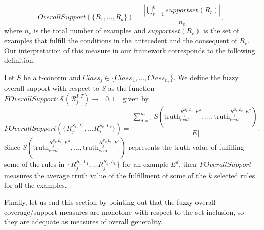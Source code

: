\begin{itemize}
	$$OverallSupport(\{R_1,\dots,R_k\}) = \frac{ \left|\displaystyle \bigcup_{r=1}^k supportset(R_r)\right|}{n_e},$$
	where $n_e$ is the total number of examples and $supportset(R_r)$ is the set of examples that fulfill the conditions in the antecedent and the consequent of $R_r$. Our interpretation of this measure in our framework corresponds to the following definition.
	\begin{definition}\label{def:FOverallSupport}
		Let $S$ be a t-conorm and $Class_j \in \{Class_1,\dots,Class_{n_c}\}$. We define the fuzzy overall support with respect to $S$ as the function $FOverallSupport : \mathcal{S}(\mathcal{R}^{I,T}_j) \to [0,1]$ given by 
		$$FOverallSupport(\{R^{S_1,L_1}_{j},\dots R^{S_k,L_k}_{j}\}) = \frac{ \displaystyle \sum_{d=1}^{n_e}S(\text{truth}_{eval}^{R^{S_1,L_1}_j,E^d},\dots, \text{truth}_{eval}^{R^{S_k,L_k}_j,E^d})}{|E|}.$$
		Since $S(\text{truth}_{eval}^{R^{S_1,L_1}_j,E^d},\dots, \text{truth}_{eval}^{R^{S_k,L_k}_j,E^d})$ represents the truth value of fulfilling some of the rules in $\{R^{S_1,L_1}_{j},\dots R^{S_k,L_k}_{j}\}$ for an example $E^d$, then $FOverallSupport$ measures the average truth value of the fulfillment of some of the $k$ selected rules for all the examples.
	\end{definition}
\end{itemize}

Finally, let us end this section by pointing out that the fuzzy overall coverage/support measures are monotone with respect to the set inclusion, so they are adequate as measures of overall generality.


